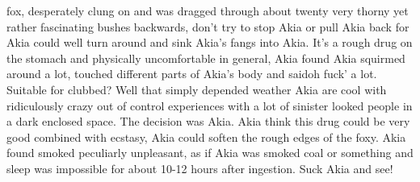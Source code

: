 \documentclass[12pt]{book}
\begin{document}
fox, desperately clung on and was dragged through about twenty very thorny yet rather fascinating bushes backwards, don't try to stop Akia or pull Akia back for Akia could well turn around and sink Akia's fangs into Akia. It's a rough drug on the stomach and physically uncomfortable in general, Akia found Akia squirmed around a lot, touched different parts of Akia's body and saidoh fuck' a lot. Suitable for clubbed? Well that simply depended weather Akia are cool with ridiculously crazy out of control experiences with a lot of sinister looked people in a dark enclosed space. The decision was Akia. Akia think this drug could be very good combined with ecstasy, Akia could soften the rough edges of the foxy. Akia found smoked peculiarly unpleasant, as if Akia was smoked coal or something and sleep was impossible for about 10-12 hours after ingestion. Suck Akia and see!
\end{document}
